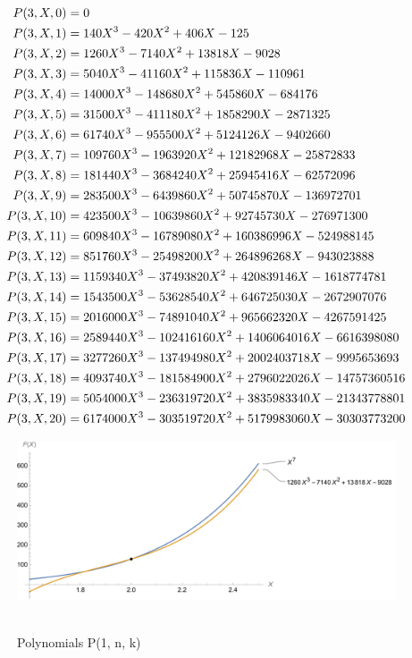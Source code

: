 ﻿\begin{align*}
    {P}(3,X,0) &= 0 \\
    {P}(3,X,1) &= 140X^3 - 420X^2 + 406X - 125 \\
    {P}(3,X,2) &= 1260X^3 - 7140X^2 + 13818X - 9028 \\
    {P}(3,X,3) &= 5040X^3 - 41160X^2 + 115836X - 110961 \\
    {P}(3,X,4) &= 14000X^3 - 148680X^2 + 545860X - 684176 \\
    {P}(3,X,5) &= 31500X^3 - 411180X^2 + 1858290X - 2871325 \\
    {P}(3,X,6) &= 61740X^3 - 955500X^2 + 5124126X - 9402660 \\
    {P}(3,X,7) &= 109760X^3 - 1963920X^2 + 12182968X - 25872833 \\
    {P}(3,X,8) &= 181440X^3 - 3684240X^2 + 25945416X - 62572096 \\
    {P}(3,X,9) &= 283500X^3 - 6439860X^2 + 50745870X - 136972701 \\
    {P}(3,X,10) &= 423500X^3 - 10639860X^2 + 92745730X - 276971300 \\
    {P}(3,X,11) &= 609840X^3 - 16789080X^2 + 160386996X - 524988145 \\
    {P}(3,X,12) &= 851760X^3 - 25498200X^2 + 264896268X - 943023888 \\
    {P}(3,X,13) &= 1159340X^3 - 37493820X^2 + 420839146X - 1618774781 \\
    {P}(3,X,14) &= 1543500X^3 - 53628540X^2 + 646725030X - 2672907076 \\
    {P}(3,X,15) &= 2016000X^3 - 74891040X^2 + 965662320X - 4267591425 \\
    {P}(3,X,16) &= 2589440X^3 - 102416160X^2 + 1406064016X - 6616398080 \\
    {P}(3,X,17) &= 3277260X^3 - 137494980X^2 + 2002403718X - 9995653693 \\
    {P}(3,X,18) &= 4093740X^3 - 181584900X^2 + 2796022026X - 14757360516 \\
    {P}(3,X,19) &= 5054000X^3 - 236319720X^2 + 3835983340X - 21343778801 \\
    {P}(3,X,20) &= 6174000X^3 - 303519720X^2 + 5179983060X - 30303773200
\end{align*}
\begin{figure}[H]
    \centering
    \includegraphics[width=1\textwidth]{sections/images/05_seventh_power_with_p_3_n_k}
    ~\caption{Polynomials P(1, n, k)}\label{fig:figure5}
\end{figure}
